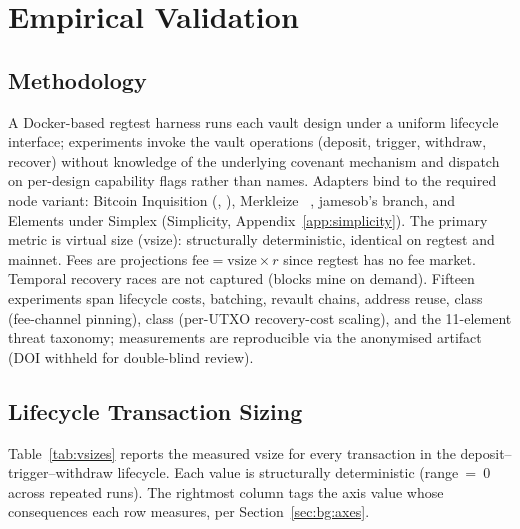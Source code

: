 
\section{Empirical Validation}
\label{sec:empirical}

\subsection{Methodology}
\label{sec:emp:method}

A Docker-based regtest harness runs each vault design under a
uniform lifecycle interface; experiments invoke the vault
operations (deposit, trigger, withdraw, recover) without knowledge
of the underlying covenant mechanism and dispatch on per-design
capability flags rather than names. Adapters bind to the
required node variant: Bitcoin Inquisition (\opctv{}, \catcsfs{}),
Merkleize \opccv{}~\cite{BIP443}, jamesob's \opvault{} branch, and
Elements under Simplex (Simplicity, Appendix~\ref{app:simplicity}).
The primary metric is virtual size (vsize): structurally
deterministic, identical on regtest and mainnet. Fees are
projections $\text{fee} = \text{vsize} \times r$ since regtest has
no fee market. Temporal recovery races are not captured (blocks mine
on demand). Fifteen experiments span lifecycle costs, batching,
revault chains, address reuse, class \classfee{} (fee-channel
pinning), class \classscale{} (per-UTXO recovery-cost scaling), and
the 11-element threat taxonomy; measurements are reproducible via the
anonymised artifact (DOI withheld for double-blind review).

\subsection{Lifecycle Transaction Sizing}
\label{sec:emp:sizes}

Table~\ref{tab:vsizes} reports the measured vsize for every
transaction in the deposit--trigger--withdraw lifecycle. Each value
is structurally deterministic (range~=~0 across repeated runs). The
rightmost column tags the axis value whose consequences each row
measures, per Section~\ref{sec:bg:axes}.

